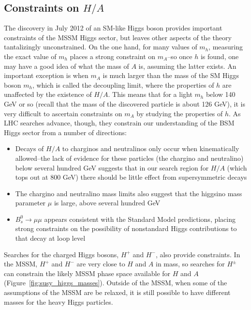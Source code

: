 \subsection{Constraints on $H/A$}
The discovery in July 2012 of an SM-like Higgs boson provides important constraints of the MSSM Higgs sector,
 but leaves other aspects of the theory tantalizingly unconstrained.  On the one hand, 
for many values of $m_h$, measuring the exact value of $m_h$ 
places a strong constraint on $m_A$--so once $h$ is found, one may have a good idea of what the mass of 
$A$ is, assuming the latter exists.  An important exception is when 
$m_A$ is much larger than the mass of the SM Higgs 
boson $m_h$, which is called the decoupling limit, where the 
properties of $h$ are unaffected by the existence of $H/A$.
  This means that for a light $m_h$ below 140 GeV 
or so (recall that the mass of the discovered particle is about 126 GeV),
 it is very difficult to ascertain constraints on $m_A$ by studying the properties of $h$.  
 As LHC searches advance, though, they constrain our understanding of the BSM 
 Higgs sector from a number of directions: 

\begin{itemize}
    \item Decays of $H/A$ to charginos and neutralinos only occur when kinematically 
allowed--the lack of evidence for these particles (the chargino and neutralino) below several hundred GeV suggests
that in our search region for $H/A$ (which tops out at 800 GeV) there should be little
effect from supersymmetric decays
    \item The chargino and neutralino mass limits also suggest that the higgsino mass
parameter $\mu$ is large, above several hundred GeV
    \item $B_s^0\rightarrow\mu\mu$ appears consistent with the Standard Model predictions,
placing strong constraints on the possibility of nonstandard Higgs contributions
to that decay at loop level \cite{bs_to_mumu}
\end{itemize}

Searches for the charged Higgs bosons, $H^+$ and $H^-$, also provide constraints.
In the MSSM, $H^+$ and $H^-$ are very close to $H$ and $A$ in mass, so searches
for $H^\pm$ can constrain the likely MSSM phase space available for $H$ and $A$ (Figure~\ref{fig:susy_higgs_masses}).
Outside of the MSSM, when some of the assumptions of the MSSM are be relaxed,
it is still possible to have different masses for the heavy Higgs particles.


